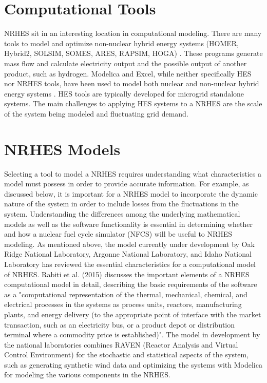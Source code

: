 \documentclass[12pt]{UIdahoMastersThesis}
\begin{document}
\section{Computational Tools}
NRHES sit in an interesting location in computational modeling. There are many tools to model and optimize non-nuclear hybrid energy systems (HOMER, Hybrid2, SOLSIM, SOMES, ARES, RAPSIM, HOGA) \cite {Bernal-Agustin2009}. These programs generate mass flow and calculate electricity output and the possible output of another product, such as hydrogen. Modelica and Excel, while neither specifically HES nor NRHES tools, have been used to model both nuclear and non-nuclear hybrid energy systems \cite{Shropshire2012, Chen2016, Binder2014, Garcia2015, Epiney2016}. HES tools are typically developed for microgrid standalone systems. The main challenges to applying HES systems to a NRHES are the scale of the system being modeled and fluctuating grid demand.
\section{NRHES Models}
Selecting a tool to model a NRHES requires understanding what characteristics a model must possess in order to provide accurate information. For example, as discussed below, it is important for a NRHES model to incorporate the dynamic nature of the system in order to include losses from the fluctuations in the system. Understanding the differences among the underlying mathematical models as well as the software functionality is essential in determining whether and how a nuclear fuel cycle simulator (NFCS) will be useful to NRHES modeling.
As mentioned above, the model currently under development by Oak Ridge National Laboratory, Argonne National Laboratory, and Idaho National Laboratory has reviewed the essential characteristics for a computational model of NRHES. Rabiti et al. (2015) discusses the important elements of a NRHES computational model in detail, describing the basic requirements of the software as a "computational representation of the thermal, mechanical, chemical, and electrical processes in the systems as process units, reactors, manufacturing plants, and energy delivery (to the appropriate point of interface with the market transaction, such as an electricity bus, or a product depot or distribution terminal where a commodity price is established)"\cite{Rabiti2015}. The model in development by the national laboratories combines RAVEN (Reactor Analysis and Virtual Control Environment) for the stochastic and statistical aspects of the system, such as generating synthetic wind data and optimizing the systems with Modelica for modeling the various components in the NRHES.
\end{document}
